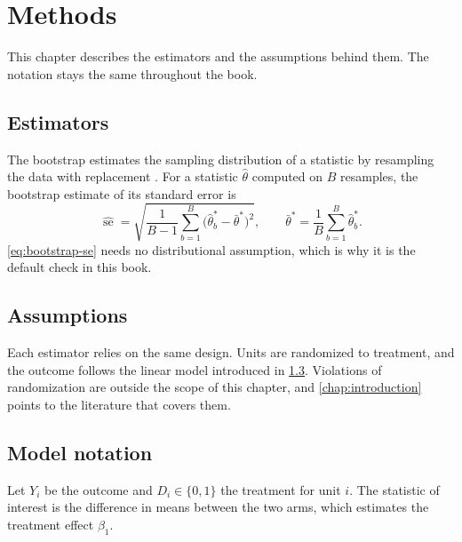 \chapter{Methods}\label{chap:methods}

This chapter describes the estimators and the assumptions behind them. The notation stays the same throughout the book.

\section{Estimators}\label{sec:estimators}

The bootstrap estimates the sampling distribution of a statistic by resampling the data with replacement \citep{efron1979}. For a statistic $\hat\theta$ computed on $B$ resamples, the bootstrap estimate of its standard error is
\begin{equation}\label{eq:bootstrap-se}
  \widehat{\operatorname{se}} = \sqrt{\frac{1}{B-1} \sum_{b=1}^{B} \bigl(\hat\theta^{*}_b - \bar\theta^{*}\bigr)^2},
  \qquad
  \bar\theta^{*} = \frac{1}{B} \sum_{b=1}^{B} \hat\theta^{*}_b.
\end{equation}
\cref{eq:bootstrap-se} needs no distributional assumption, which is why it is the default check in this book.

\section{Assumptions}\label{sec:assumptions}

Each estimator relies on the same design. Units are randomized to treatment, and the outcome follows the linear model introduced in \cref{sec:model-notation}. Violations of randomization are outside the scope of this chapter, and \cref{chap:introduction} points to the literature that covers them.

\section{Model notation}\label{sec:model-notation}

Let $Y_i$ be the outcome and $D_i \in \{0,1\}$ the treatment for unit $i$. The statistic of interest is the difference in means between the two arms, which estimates the treatment effect $\beta_1$.
